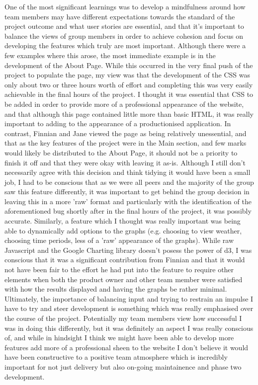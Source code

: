 \documentclass{scrreprt}
\begin{document}
One of the most significant learnings was to develop a mindfulness around how team members may have different expectations towards the standard of the project outcome and what user stories are essential, and that it's important to balance the views of group members in order to achieve cohesion and focus on developing the features which truly are most important. Although there were a few examples where this arose, the most immediate example is in the development of the About Page. While this occurred in the very final push of the project to populate the page, my view was that the development of the CSS was only about two or three hours worth of effort and completing this was very easily achievable in the final hours of the project. I thought it was essential that CSS to be added in order to provide more of a professional appearance of the website, and that although this page contained little more than basic HTML, it was really important to adding to the appearance of a productionised application. In contrast, Finnian and Jane viewed the page as being relatively unessential, and that as the key features of the project were in the Main section, and few marks would likely be distributed to the About Page, it should not be a priority to finish it off and that they were okay with leaving it as-is. Although I still don't necessarily agree with this decision and think tidying it would have been a small job, I had to be conscious that as we were all peers and the majority of the group saw this feature differently, it was important to get behind the group decision in leaving this in a more 'raw' format and particularly with the identification of the aforementioned bug shortly after in the final hours of the project, it was possibly accurate. Similarly, a feature which I thought was really important was being able to dynamically add options to the graphs (e.g. choosing to view weather, choosing time periods, less of a 'raw' appearance of the graphs). While raw Javascript and the Google Charting library doesn't posess the power of d3, I was conscious that it was a significant contribution from Finnian and that it would not have been fair to the effort he had put into the feature to require other elements when both the product owner and other team member were satisfied with how the results displayed and having the graphs be rather minimal. Ultimately, the importance of balancing input and trying to restrain an impulse I have to try and steer development is something which was really emphasised over the course of the project. Potentially my team members view how successful I was in doing this differently, but it was definitely an aspect I was really conscious of, and while in hindsight I think we might have been able to develop more features add more of a professional sheen to the website I don't believe it would have been constructive to a positive team atmosphere which is incredibly important for not just delivery but also on-going maintainence and phase two development.
\end{document}
